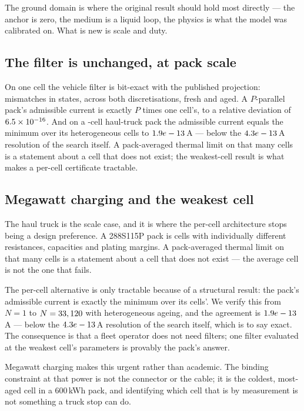 \documentclass[11pt,letterpaper]{article}
\theoremstyle{definition}
\theoremstyle{remark}
\begin{document}
The ground domain is where the original result should hold most directly --- the anchor is zero,
the medium is a liquid loop, the physics is what the model was calibrated on. What is new is
scale and duty.

\subsection{The filter is unchanged, at pack scale}

On one cell the vehicle filter is bit-exact with the published projection: \gReduceMismatch{}
mismatches in \gReduceStates{} states, across both discretisations, fresh and aged. A
$P$-parallel pack's admissible current is exactly $P$ times one cell's, to a relative deviation
of $6.5\times 10^{-16}$. And on a \gTruckCells{}-cell haul-truck pack the admissible current equals the
minimum over its heterogeneous cells to $1.9e-13$\,A --- below the $4.3e-13$\,A resolution
of the search itself. A pack-averaged thermal limit on that many cells is a statement about a
cell that does not exist; the weakest-cell result is what makes a per-cell certificate tractable.

\subsection{Megawatt charging and the weakest cell}

The haul truck is the scale case, and it is where the per-cell architecture stops being a design
preference. A 288S115P pack is \gTruckCells{} cells with individually different resistances,
capacities and plating margins. A pack-averaged thermal limit on that many cells is a statement
about a cell that does not exist --- the average cell is not the one that fails.

The per-cell alternative is only tractable because of a structural result: the pack's admissible
current is exactly the minimum over its cells'. We verify this from $N=1$ to $N=33,120{}$
with heterogeneous ageing, and the agreement is $1.9e-13$\,A --- below the $4.3e-13$\,A
resolution of the search itself, which is to say exact. The consequence is that a fleet operator
does not need \gTruckCells{} filters; one filter evaluated at the weakest cell's parameters is
provably the pack's answer.

Megawatt charging makes this urgent rather than academic. The binding constraint at that power
is not the connector or the cable; it is the coldest, most-aged cell in a 600\,kWh pack, and
identifying which cell that is by measurement is not something a truck stop can do.
\end{document}

